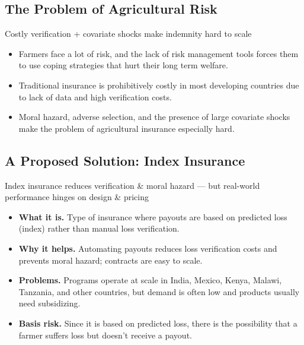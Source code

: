 \documentclass{beamer}
\begin{document}
\subsection*{The Problem of Agricultural Risk}
\begin{frame}{Costly verification + covariate shocks make indemnity hard to scale}
\begin{itemize}
    \setlength\itemsep{2em}
    \item Farmers face a lot of risk, and the lack of risk management tools forces them to use coping strategies that hurt their long term welfare.
   
    \item Traditional insurance is prohibitively costly in most developing countries due to lack of data and high verification costs.

    \item Moral hazard, adverse selection, and the presence of large covariate shocks make the problem of agricultural insurance especially hard. 
\end{itemize}
\end{frame}

\subsection*{A Proposed Solution: Index Insurance}
\begin{frame}{Index insurance reduces verification \& moral hazard — but real-world performance hinges on design \& pricing}

\small
\begin{itemize}
  \item \textbf{What it is.} Type of insurance where payouts are based on predicted loss (index) rather than manual loss verification.
  \item \textbf{Why it helps.} Automating payouts reduces loss verification costs and prevents moral hazard; contracts are easy to scale.
  \item \textbf{Problems.} Programs operate at scale in India, Mexico, Kenya, Malawi, Tanzania, and other countries, but demand is often low and products usually need subsidizing.
  \item \textbf{Basis risk.} Since it is based on predicted loss, there is the possibility that a farmer suffers loss but doesn't receive a payout. 
\end{itemize}

\end{frame}
\end{document}
